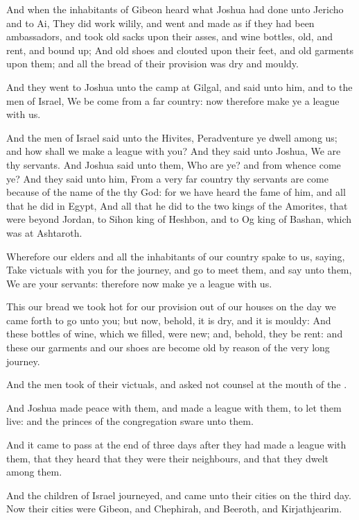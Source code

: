 \verse And when the inhabitants of Gibeon heard what Joshua had done unto Jericho and to Ai, \verse They did work wilily, and went and made as if they had been ambassadors, and took old sacks upon their asses, and wine bottles, old, and rent, and bound up; \verse And old shoes and clouted upon their feet, and old garments upon them; and all the bread of their provision was dry and mouldy.

\verse And they went to Joshua unto the camp at Gilgal, and said unto him, and to the men of Israel, We be come from a far country: now therefore make ye a league with us.

\verse And the men of Israel said unto the Hivites, Peradventure ye dwell among us; and how shall we make a league with you?  \verse And they said unto Joshua, We are thy servants. And Joshua said unto them, Who are ye? and from whence come ye?  \verse And they said unto him, From a very far country thy servants are come because of the name of the \LORD thy God: for we have heard the fame of him, and all that he did in Egypt, \verse And all that he did to the two kings of the Amorites, that were beyond Jordan, to Sihon king of Heshbon, and to Og king of Bashan, which was at Ashtaroth.

\verse Wherefore our elders and all the inhabitants of our country spake to us, saying, Take victuals with you for the journey, and go to meet them, and say unto them, We are your servants: therefore now make ye a league with us.

\verse This our bread we took hot for our provision out of our houses on the day we came forth to go unto you; but now, behold, it is dry, and it is mouldy: \verse And these bottles of wine, which we filled, were new; and, behold, they be rent: and these our garments and our shoes are become old by reason of the very long journey.

\verse And the men took of their victuals, and asked not counsel at the mouth of the \LORD.

\verse And Joshua made peace with them, and made a league with them, to let them live: and the princes of the congregation sware unto them.

\verse And it came to pass at the end of three days after they had made a league with them, that they heard that they were their neighbours, and that they dwelt among them.

\verse And the children of Israel journeyed, and came unto their cities on the third day. Now their cities were Gibeon, and Chephirah, and Beeroth, and Kirjathjearim.

